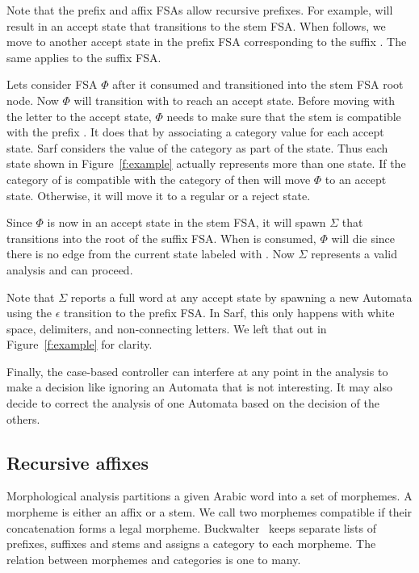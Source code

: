 \documentclass[11pt,letterpaper]{article}
\begin{document}
Note that the prefix and affix FSAs allow recursive 
prefixes. For example,  will result in an accept state
that transitions to the stem FSA. 
When  follows, we move to another accept state in the 
prefix FSA corresponding to the suffix . 
The same applies to the suffix FSA. 

Lets consider FSA $\Phi$ after it consumed  
and transitioned into the stem FSA root node. 
Now $\Phi$ will transition with  to reach an accept 
state. 
Before moving with the letter  to the accept state,
$\Phi$ needs to make sure that the stem  is compatible
with the prefix . 
It does that by associating a category value for each accept state. 
Sarf considers the value of the category as part of the state.
Thus each state shown in Figure~\ref{f:example} actually represents
more than one state. 
If the category of  is compatible with the category of
 then  will move $\Phi$ to an accept state. 
Otherwise, it will move it to a regular or a reject state. 

Since $\Phi$ is now in an accept state in the stem FSA, it will
spawn $\Sigma$ that transitions into the root of the 
suffix FSA. When  is consumed, $\Phi$ will die since 
there is no edge from the current state labeled with . 
Now $\Sigma$ represents a valid analysis and can proceed.

Note that $\Sigma$ reports a full word at any accept state
by spawning a new Automata using the $\epsilon$ transition
to the prefix FSA.
In Sarf, this only happens with white space, delimiters, 
and non-connecting letters. 
We left that out in Figure~\ref{f:example} for clarity. 

Finally, the case-based controller can interfere at any point in the 
analysis to make a decision like ignoring an Automata that 
is not interesting. 
It may also decide to correct the analysis of one Automata
based on the decision of the others. 

\subsection{Recursive affixes}
\label{sec:recaffix}

Morphological analysis partitions a given Arabic word
into a set of morphemes.
A morpheme is either an affix or a stem. 
We call two morphemes compatible if their concatenation
forms a legal morpheme. 
Buckwalter~ keeps separate lists 
of prefixes, suffixes and stems and assigns a category
to each morpheme. 
The relation between morphemes and categories is one 
to many. 
\end{document}
